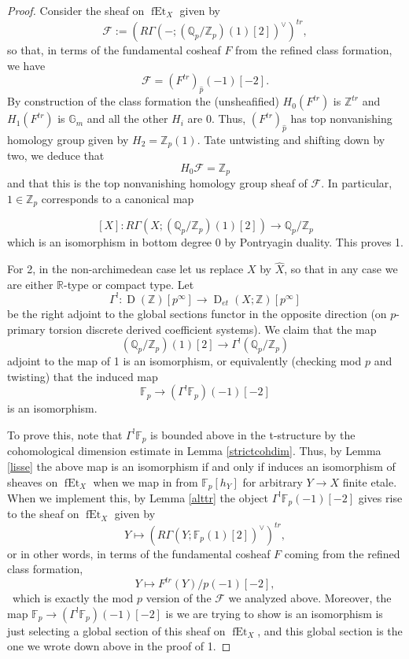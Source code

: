 \documentclass[12pt]{article}
\theoremstyle{definition}
\newcommand{\on}{\operatorname}
\newcommand{\mc}{\mathcal}
\newcommand{\mbb}{\mathbb}
\newcommand{\wh}{\widehat}
\begin{document}
\begin{proof}
Consider the sheaf on $\on{fEt}_X$ given by
$$\mathcal{F}:= \left(R\Gamma(-;(\mbb{Q}_p/\mbb{Z}_p)(1)[2])^\vee\right)^{tr},$$
so that, in terms of the fundamental cosheaf $F$ from the refined class formation, we have
$$\mc{F} = (F^{tr})_{\wh{p}}(-1)[-2].$$
By construction of the class formation the (unsheafified) $H_0(F^{tr})$ is $\mbb{Z}^{tr}$ and $H_1(F^{tr})$ is $\mbb{G}_m$ and all the other $H_i$ are $0$.  Thus, $(F^{tr})_{\wh{p}}$ has top nonvanishing homology group given by $H_2 = \mbb{Z}_p(1)$.  Tate untwisting and shifting down by two, we deduce that
$$H_0\mc{F} = \mbb{Z}_p$$
and that this is the top nonvanishing homology group sheaf of $\mc{F}$.  In particular, $1\in\mbb{Z}_p$ corresponds to a canonical map

$$[X]: R\Gamma(X;(\mbb{Q}_p/\mbb{Z}_p)(1)[2])\to\mbb{Q}_p/\mbb{Z}_p$$
which is an isomorphism in bottom degree $0$ by Pontryagin duality.  This proves 1.

For 2, in the non-archimedean case let us replace $X$ by $\wh{X}$, so that in any case we are either $\mbb{R}$-type or compact type. Let
$$\Gamma^!:\on{D}(\mbb{Z})[p^\infty] \to \on{D}_{et}(X;\mbb{Z})[p^\infty]$$
be the right adjoint to the global sections functor in the opposite direction (on $p$-primary torsion discrete derived coefficient systems).  We claim that the map
$$(\mbb{Q}_p/\mbb{Z}_p)(1)[2] \to \Gamma^!(\mbb{Q}_p/\mbb{Z}_p)$$
adjoint to the map of 1 is an isomorphism, or equivalently (checking mod $p$ and twisting) that the induced map
$$\mbb{F}_p \to (\Gamma^!\mbb{F}_p)(-1)[-2]$$
is an isomorphism.

To prove this, note that $\Gamma^!\mbb{F}_p$ is bounded above in the t-structure by the cohomological dimension estimate in Lemma \ref{strictcohdim}.  Thus, by Lemma \ref{lisse} the above map is an isomorphism if and only if induces an isomorphism of sheaves on $\on{fEt}_X$ when we map in from $\mbb{F}_p[h_Y]$ for arbitrary $Y\to X$ finite etale.  When we implement this, by Lemma \ref{alttr} the object $\Gamma^!\mbb{F}_p(-1)[-2]$ gives rise to the sheaf on $\on{fEt}_X$ given by
$$Y\mapsto (R\Gamma(Y;\mbb{F}_p(1)[2])^\vee)^{tr},$$
or in other words, in terms of the fundamental cosheaf $F$ coming from the refined class formation,
$$Y\mapsto F^{tr}(Y)/p(-1)[-2],$$\
which is exactly the mod $p$ version of the $\mc{F}$ we analyzed above.  Moreover, the map $\mbb{F}_p\to (\Gamma^!\mbb{F}_p)(-1)[-2]$ is we are trying to show is an isomorphism is just selecting a global section of this sheaf on $\on{fEt}_X$, and this global section is the one we wrote down above in the proof of 1.


\end{proof}
\end{document}
